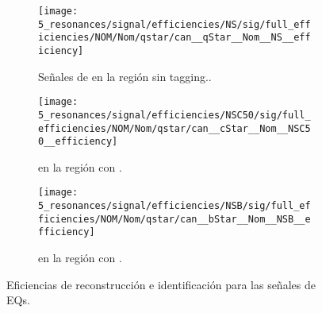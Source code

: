 \begin{figure}[ht!]
    \centering
    \begin{subfigure}[t]{0.32\linewidth}
        \centering
        \texttt{[image: 5\_resonances/signal/efficiencies/NS/sig/full\_efficiencies/NOM/Nom/qstar/can\_\_qStar\_\_Nom\_\_NS\_\_efficiency]}
        \caption{Señales de \qstar en la región sin tagging..}
        \label{fig:signals:acc_eff:efficiencies:qstar}
    \end{subfigure}
    \hfill
    \begin{subfigure}[t]{0.32\linewidth}
        \centering
        \texttt{[image: 5\_resonances/signal/efficiencies/NSC50/sig/full\_efficiencies/NOM/Nom/qstar/can\_\_cStar\_\_Nom\_\_NSC50\_\_efficiency]}
        \caption{\cstar en la región con \ctagging.}
        \label{fig:signals:acc_eff:efficiencies:cstar}
    \end{subfigure}
    \hfill
    \begin{subfigure}[t]{0.32\linewidth}
        \centering
        \texttt{[image: 5\_resonances/signal/efficiencies/NSB/sig/full\_efficiencies/NOM/Nom/qstar/can\_\_bStar\_\_Nom\_\_NSB\_\_efficiency]}
        \caption{\bstar en la región con \btagging.}
        \label{fig:signals:acc_eff:efficiencies:bstar}
    \end{subfigure}
    \caption{Eficiencias de reconstrucción e identificación para las señales de \acp{EQ}.}
    \label{fig:signals:acc_eff:efficiencies}
\end{figure}


